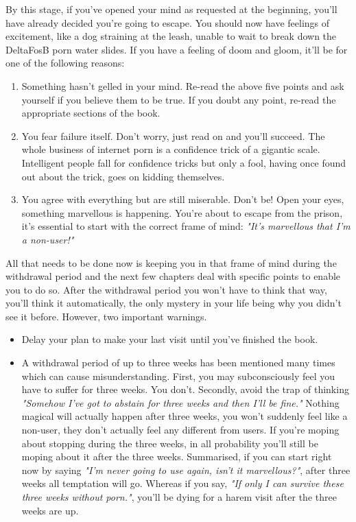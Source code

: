 \documentclass[easypeasy]{subfiles}
\begin{document}
By this stage, if you've opened your mind as requested at the beginning, you'll have already decided you're going to escape. You should now have feelings of excitement, like a dog straining at the leash, unable to wait to break down the DeltaFosB porn water slides. If you have a feeling of doom and gloom, it'll be for one of the following reasons:
\begin{enumerate}
  \item Something hasn't gelled in your mind. Re-read the above five points and ask yourself if you believe them to be true. If you doubt any point, re-read the appropriate sections of the book.

  \item You fear failure itself. Don't worry, just read on and you'll succeed. The whole business of internet porn is a confidence trick of a gigantic scale. Intelligent people fall for confidence tricks but only a fool, having once found out about the trick, goes on kidding themselves.

  \item You agree with everything but are still miserable. Don't be! Open your eyes, something marvellous is happening. You're about to escape from the prison, it's essential to start with the correct frame of mind: \textit{"It's marvellous that I'm a non-user!"}
  \end{enumerate}

All that needs to be done now is keeping you in that frame of mind during the withdrawal period and the next few chapters deal with specific points to enable you to do so. After the withdrawal period you won't have to think that way, you'll think it automatically, the only mystery in your life being why you didn't see it before. However, two important warnings.

  \begin{itemize}
  \item Delay your plan to make your last visit until you've finished the book.
  \item A withdrawal period of up to three weeks has been mentioned many times which can cause misunderstanding. First, you may subconsciously feel you have to suffer for three weeks. You don't. Secondly, avoid the trap of thinking \textit{"Somehow I've got to abstain for three weeks and then I'll be fine."} Nothing magical will actually happen after three weeks, you won't suddenly feel like a non-user, they don't actually feel any different from users. If you're moping about stopping during the three weeks, in all probability you'll still be moping about it after the three weeks. Summarised, if you can start right now by saying \textit{"I'm never going to use again, isn't it marvellous?"}, after three weeks all temptation will go. Whereas if you say, \textit{"If only I can survive these three weeks without porn."}, you'll be dying for a harem visit after the three weeks are up.
  \end{itemize}
\end{document}
